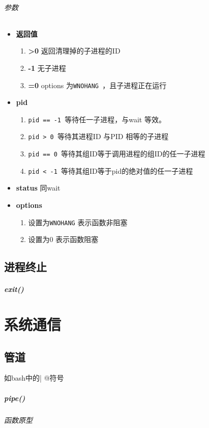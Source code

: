 \documentclass[UTF8,a4paper,12pt]{ctexbook}
\begin{document}
				\subparagraph{参数}
					\begin{itemize}[itemindent = 1em]
						\item \textbf{返回值 }
							\begin{enumerate}[itemindent = 1em]
								\item \textbf{>0 }返回清理掉的子进程的ID
								\item \textbf{-1 }无子进程
								\item \textbf{=0 }options 为\verb|WNOHANG |，且子进程正在运行
							\end{enumerate}
						\item \textbf{pid }
							\begin{enumerate}[itemindent = 1em]
								\item \verb|pid == -1 |等待任一子进程，与wait 等效。
								\item \verb|pid > 0 |等待其进程ID 与PID 相等的子进程
								\item \verb|pid == 0 |等待其组ID等于调用进程的组ID的任一子进程
								\item \verb|pid < -1 |等待其组ID等于pid的绝对值的任一子进程
							\end{enumerate}						
						\item \textbf{status }同wait
						\item \textbf{options }
							\begin{enumerate}[itemindent = 1em]
								\item 设置为\verb|WNOHANG| 表示函数非阻塞
								\item 设置为0 表示函数阻塞
							\end{enumerate}
					\end{itemize}		
		
	\section{进程终止}
		\paragraph{exit()}
			
\chapter{系统通信}						
	\section{管道}如bash中的\verb@ | @符号
		\paragraph{pipe()}
			\subparagraph{函数原型}
			
\end{document}
